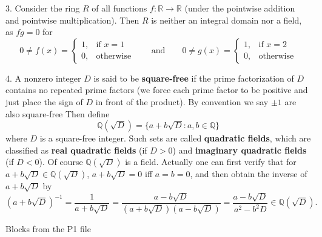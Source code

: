 \documentclass{article}
\begin{document}
\begin{Rmk_continued}{}
    \begin{compactenum}
        \item[3.] \textcolor{Th}{Consider the ring $R$ of all functions $f: \mathbb{R} \to \mathbb{R}$ (under the pointwise addition and pointwise multiplication). Then $R$ is neither an integral domain nor a field, as $fg = 0$ for 
        $$ 0\neq f(x) = \begin{cases}
            1, & \text{if } x = 1 \\
            0, & \text{otherwise}
        \end{cases} \qquad\text{and}\qquad
        0\neq g(x) = \begin{cases}
            1, & \text{if } x = 2 \\
            0, & \text{otherwise}
        \end{cases} $$ }
        \item[4.] \textcolor{Df}{A nonzero integer $D$ is said to be \textbf{square-free} if the prime factorization of $D$ contains no repeated prime factors (we force each prime factor to be positive and just place the sign of $D$ in front of the product). By convention we say $\pm 1$ are also square-free} Then \textcolor{Df}{define $$ \mathbb{Q}(\sqrt{D}) = \{a + b\sqrt{D}: a, b \in \mathbb{Q}\} $$
        where $D$ is a square-free integer. Such sets are called \textbf{quadratic fields}, which are classified as \textbf{real quadratic fields} (if $D>0$) and \textbf{imaginary quadratic fields} (if $D<0$).} Of course \textcolor{Th}{$\mathbb{Q}(\sqrt{D})$ is a field.} Actually one can first verify that \textcolor{Th}{for $a+b\sqrt{D}\in\mathbb{Q}(\sqrt{D})$, $a+b\sqrt{D} = 0$ iff $a = b = 0$,} and then \textcolor{Th}{obtain the inverse of $a+b\sqrt{D}$ by
        $$ (a+b\sqrt{D})^{-1} = \frac{1}{a+b\sqrt{D}} = \frac{a-b\sqrt{D}}{(a+b\sqrt{D})(a-b\sqrt{D})} = \frac{a-b\sqrt{D}}{a^2 - b^2 D} \in \mathbb{Q}(\sqrt{D}). $$}
    \end{compactenum}
\end{Rmk_continued}

\begin{Df}{Blocks from the P1 file}
\end{Df}
\end{document}
